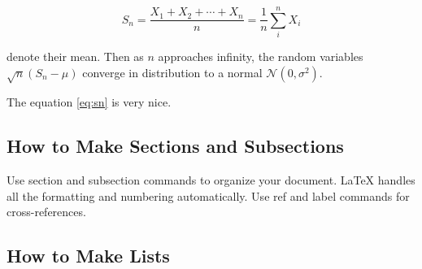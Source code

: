 \documentclass[a4paper,12pt]{article}
\begin{document}
\begin{equation}
S_n = \frac{X_1 + X_2 + \cdots + X_n}{n}
      = \frac{1}{n}\sum_{i}^{n} X_i
\label{eq:sn}
\end{equation}

denote their mean. Then as $n$ approaches infinity, the random variables $\sqrt{n}(S_n - \mu)$ converge in distribution to a normal $\mathcal{N}(0, \sigma^2)$.

The equation \ref{eq:sn} is very nice.

\subsection{How to Make Sections and Subsections}

Use section and subsection commands to organize your document. \LaTeX{} handles all the formatting and numbering automatically. Use ref and label commands for cross-references.


\subsection{How to Make Lists}

{}


%
%



\end{document}
